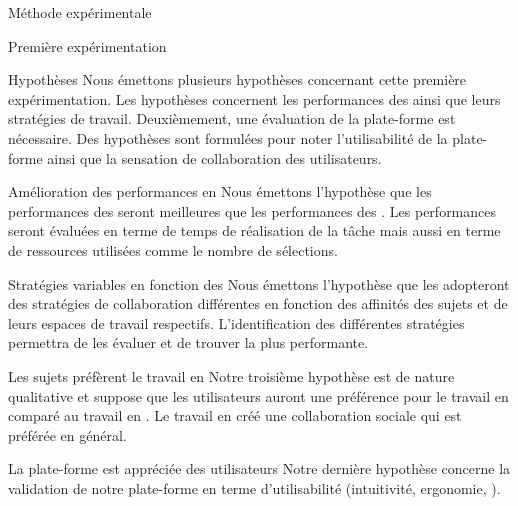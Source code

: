 \documentclass[myfrancais,ngerman,english,frenchb]{mythesis}
\begin{document}
	\begin{mychapter}{Méthode expérimentale}
		\begin{mysection}{Première expérimentation}
			\begin{mysubsection}{Hypothèses}
				Nous émettons plusieurs hypothèses concernant cette première expérimentation.
				Les hypothèses concernent les performances des  ainsi que leurs stratégies de travail.
				Deuxièmement, une évaluation de la plate-forme est nécessaire.
				Des hypothèses sont formulées pour noter l'utilisabilité de la plate-forme ainsi que la sensation de collaboration des utilisateurs.
				\begin{myparagraph}{ Amélioration des performances en }
					Nous émettons l'hypothèse que les performances des  seront meilleures que les performances des .
					Les performances seront évaluées en terme de temps de réalisation de la tâche mais aussi en terme de ressources utilisées comme le nombre de sélections.
				\end{myparagraph}
				\begin{myparagraph}{ Stratégies variables en fonction des }
					Nous émettons l'hypothèse que les  adopteront des stratégies de collaboration différentes en fonction des affinités des sujets et de leurs espaces de travail respectifs.
					L'identification des différentes stratégies permettra de les évaluer et de trouver la plus performante.
				\end{myparagraph}
				\begin{myparagraph}{ Les sujets préfèrent le travail en }
					Notre troisième hypothèse est de nature qualitative et suppose que les utilisateurs auront une préférence pour le travail en  comparé au travail en .
					Le travail en  créé une collaboration sociale qui est préférée en général.
				\end{myparagraph}
				\begin{myparagraph}{ La plate-forme est appréciée des utilisateurs}
					Notre dernière hypothèse concerne la validation de notre plate-forme en terme d'utilisabilité (intuitivité, ergonomie, \myetc).

\end{myparagraph}
\end{mysubsection}
\end{mysection}
\end{mychapter}
\end{document}
